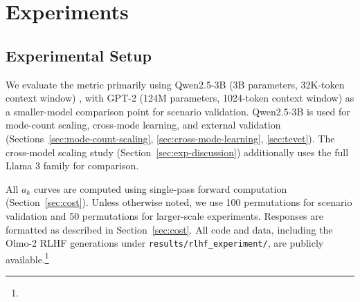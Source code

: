 \section{Experiments}\label{sec:experiments}

\subsection{Experimental Setup}\label{sec:exp-setup}

We evaluate the metric primarily using Qwen2.5-3B (3B parameters, 32K-token context window) \citep{yang2024qwen25}, with GPT-2 (124M parameters, 1024-token context window) \citep{radford2019language} as a smaller-model comparison point for scenario validation.
Qwen2.5-3B is used for mode-count scaling, cross-mode learning, and external validation (Sections~\ref{sec:mode-count-scaling}, \ref{sec:cross-mode-learning}, \ref{sec:tevet}).
The cross-model scaling study (Section~\ref{sec:exp-discussion}) additionally uses the full Llama 3 family for comparison.

All $a_k$ curves are computed using single-pass forward computation (Section~\ref{sec:cost}).
Unless otherwise noted, we use 100 permutations for scenario validation and 50 permutations for larger-scale experiments.
Responses are formatted as described in Section~\ref{sec:cost}.
All code and data, including the Olmo-2 RLHF generations under \texttt{results/rlhf\_experiment/}, are publicly available.\footnote{\projectGithubUrl}

